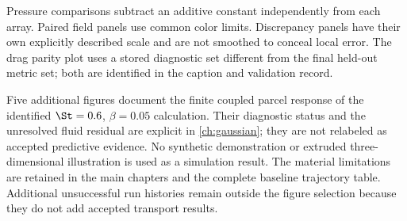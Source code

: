 Pressure comparisons subtract an additive constant independently from each
array. Paired field panels use common color limits. Discrepancy panels have
their own explicitly described scale and are not smoothed to conceal local
error. The drag parity plot uses a stored diagnostic set different from
the final held-out metric set; both are identified in the caption and
validation record.

Five additional figures document the finite coupled parcel response of the
identified $\St=0.6$, $\beta=0.05$ calculation. Their diagnostic status and
the unresolved fluid residual are explicit in \cref{ch:gaussian}; they
are not relabeled as accepted predictive evidence. No synthetic
demonstration or extruded three-dimensional illustration is used as a
simulation result.
The material limitations are retained in the main chapters and the complete
baseline trajectory table. Additional unsuccessful run histories remain
outside the figure selection because they do not add accepted transport
results.

